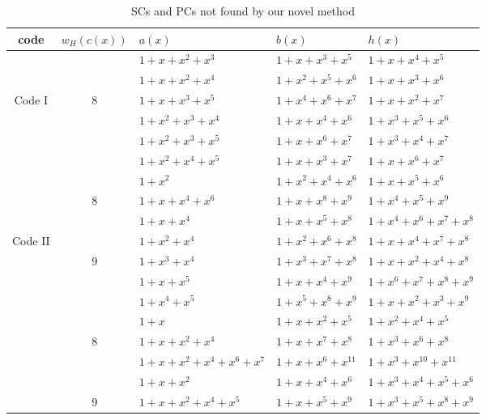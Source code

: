 \documentclass[journal,draftcls,onecolumn,12pt,twoside]{IEEEtran}
\begin{document}
\begin{table}[htbp]
		\caption{SCs and PCs not found by our novel method}
		\centering
		\begin{tabularx}{0.95\textwidth}{c|cXXX} 
			\toprule
			code & $w_H(c(x))$& $a(x)$ & $b(x)$ & $h(x)$ \\ %
			\midrule
			&&$1+x+x^2+x^3$ 		&$1+x+x^3+x^5$ 		& $1+x+x^4+x^5$\\
			&&$1+x+x^2+x^4$ 		&$1+x^2+x^5+x^6$		& $1+x+x^3+x^6$\\
			Code I&8&$1+x+x^3+x^5$ 		&$1+x^4+x^6+x^7$ 		& $1+x+x^2+x^7$\\
			&&$1+x^2+x^3+x^4$ 	&$1+x+x^4+x^6$ 		& $1+x^3+x^5+x^6$\\
			&&$1+x^2+x^3+x^5$ 	&$1+x+x^6+x^7$ 		& $1+x^3+x^4+x^7$\\
			&&$1+x^2+x^4+x^5$ 	&$1+x+x^3+x^7$ 		& $1+x+x^6+x^7$\\
			\cline{1-5}
			&&$1+x^2$ 				&$1+x^2+x^4+x^6$ 		& $1+x+x^5+x^6$\\
			&8&$1+x+x^4+x^6$ 		&$1+x+x^8+x^9$			& $1+x^4+x^5+x^9$\\
			\cline{2-5}
			&&$1+x+x^4$ 		&$1+x+x^5+x^8$ 		& $1+x^4+x^6+x^7+x^8$\\
			Code II&&$1+x^2+x^4$ 		&$1+x^2+x^6+x^8$ 		& $1+x+x^4+x^7+x^8$\\
			&9&$1+x^3+x^4$ 	&$1+x^3+x^7+x^8$ 		& $1+x+x^2+x^4+x^8$\\
			&&$1+x+x^5$ 		&$1+x+x^4+x^9$ 		& $1+x^6+x^7+x^8+x^9$\\
			&&$1+x^4+x^5$ 		&$1+x^5+x^8+x^9$ 		& $1+x+x^2+x^3+x^9$\\
			\cline{1-5}
			&&$1+x$ 						& $1+x+x^2+x^5$ 			& $1+x^2+x^4+x^5$\\
			&8&$1+x+x^2+x^4$ 				& $1+x+x^7+x^8$ 			& $1+x^3+x^6+x^8$\\
			&&$1+x+x^2+x^4+x^6+x^7$ 	& $1+x+x^6+x^{11}$ 			& $1+x^3+x^{10}+x^{11}$\\
			\cline{2-5}
			&&$1+x+x^2$ 					& $1+x+x^4+x^6$ 			& $1+x^{3}+x^{4}+x^5+x^6$\\
			&9&$1+x+x^2+x^4+x^5$ 		& $1+x+x^5+x^9$ 			& $1+x^{3}+x^{5}+x^8+x^9$\\
			

\end{tabularx}
\end{table}
\end{document}

